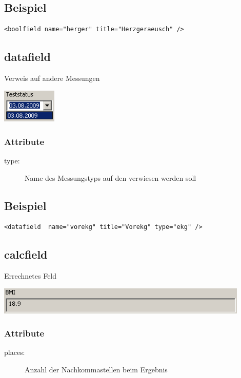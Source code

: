 \documentclass[a4paper]{scrartcl}
\begin{document}
\subsection{Beispiel}
\begin{lstlisting}
<boolfield name="herger" title="Herzgeraeusch" />
\end{lstlisting}

\subsection{datafield}
Verweis auf andere Messungen
\begin{center}
    \includegraphics[width=2.6cm]{images/datafield.png}
\end{center}
\subsubsection{Attribute}
\begin{description}
    \item[type:] Name des Messungstyps auf den verwiesen werden soll
\end{description}
\subsection{Beispiel}
\begin{lstlisting}
<datafield  name="vorekg" title="Vorekg" type="ekg" />
\end{lstlisting}

\subsection{calcfield}
Errechnetes Feld
\begin{center}
    \includegraphics[width=12cm]{images/calcfield.png}
\end{center}
\subsubsection{Attribute}
\begin{description}
    \item[places:] Anzahl der Nachkommastellen beim Ergebnis
\end{description}
\end{document}
